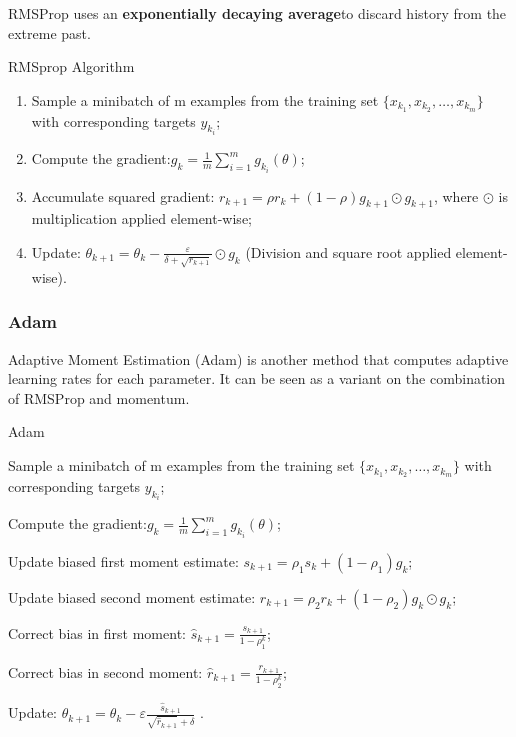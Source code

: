 \documentclass[11pt]{article} %
\begin{document}
RMSProp uses an \textbf{exponentially decaying average}to discard history from the extreme past.
\begin{algorithm}[htb]
\caption{RMSprop Algorithm}
\label{RMSprop}
  \begin{enumerate}
  \item Sample a minibatch of m examples from the training set $\{x_{k_1}, x_{k_2}, \dots, x_{k_m}\}$ with corresponding targets $y_{k_i}$;
  \item Compute the gradient:$g_{k} = \frac{1}{m}\sum_{i=1}^{m}g_{k_{i}}({\theta})$;
  \item Accumulate squared gradient: $r_{k+1}= \rho r_k+(1-\rho)g_{k+1}\odot g_{k+1}$, where $\odot$ is multiplication applied element-wise;
  \item Update: ${\theta}_{k+1}={\theta}_k - \frac{\varepsilon}{\delta + \sqrt{r_{k+1}}}\odot g_k$ (Division and square root applied element-wise).
\end{enumerate}

\end{algorithm}

\subsubsection{Adam}
Adaptive Moment Estimation (Adam) is another method that computes adaptive learning rates for each parameter.
It can be seen as a variant on the combination of RMSProp and momentum.

\begin{algorithm}
\caption{Adam}
\label{Adam}
 Sample a minibatch of m examples from the training set $\{x_{k_1}, x_{k_2}, \dots, x_{k_m}\}$ with corresponding targets $y_{k_i}$;

 Compute the gradient:$g_{k} = \frac{1}{m}\sum_{i=1}^{m}g_{k_{i}}({\theta})$;

 Update biased first moment estimate: $s_{k+1}={\rho}_1 s_k + (1-{\rho}_1)g_k$;

 Update biased second moment estimate: $r_{k+1}={\rho}_2 r_k + (1-{\rho}_2)g_k\odot g_k$;

 Correct bias in first moment: $\hat s_{k+1}=\frac{s_{k+1}}{1-{\rho}_{1}^k}$;

 Correct bias in second moment: $\hat r_{k+1}=\frac{r_{k+1}}{1-{\rho}_{2}^k}$;

 Update: ${\theta}_{k+1}={\theta}_k -\varepsilon \frac{\hat s_{k+1}}{\sqrt{\hat r_{k+1}}+\delta}$ .
\end{algorithm}
\end{document}
